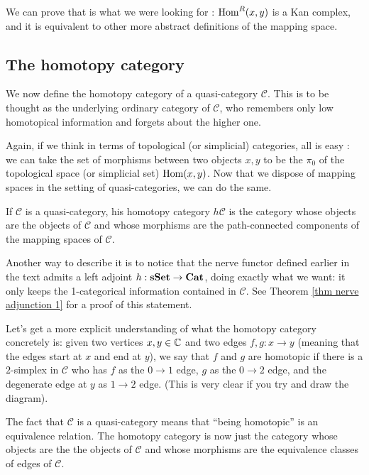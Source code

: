 \begin{refsection}
We can prove that is what we were looking for :  $\mathrm{Hom}^R(x,y)$ is a Kan complex, and it is equivalent to other more abstract definitions of the mapping space.



\subsection{The homotopy category}

We now define the homotopy category of a quasi-category $\mathcal C$. This is to be thought as the underlying ordinary category of $\mathcal C$, who remembers only low homotopical information and forgets about the higher one. 

Again, if we think in terms of topological (or simplicial) categories, all is easy : we can take the set of morphisms between two objects $x,y$ to be the $\pi_0$ of the topological space (or simplicial set) $\mathrm{Hom} (x,y)$. Now that we dispose of mapping spaces in the setting of quasi-categories, we can do the same.

\begin{defin}
If $\mathcal C$ is a  quasi-category, his homotopy category $h\mathcal C$ is the category whose objects are the objects of $\mathcal C$ and whose morphisms are the path-connected components of the mapping spaces of $\mathcal C$.
\end{defin}

Another way to describe it is to notice that the nerve functor defined earlier in the text admits a left adjoint $h: \mathbf{sSet} \to \mathbf{Cat}$, doing exactly what we want: it only keeps the 1-categorical information contained in $\mathcal C$. See Theorem \ref{thm nerve adjunction 1} for a proof of this statement.

Let's get a more explicit understanding of what the homotopy category concretely is: given two vertices $x,y \in \mathbb{C}$ and two edges $f,g : x \to y$ (meaning that the edges start at $x$ and end at $y$), we say that $f$ and $g$ are homotopic if there is a $2$-simplex in $\mathcal C$ who has $f$ as the $0\to 1$ edge, $g$ as the $0\to 2$ edge, and the degenerate edge at $y$ as $1 \to 2$ edge. (This is very clear if you try and draw the diagram).

The fact that $\mathcal C$ is a quasi-category means that ``being homotopic'' is an equivalence relation. The homotopy category is now just the category whose objects are the the objects of $\mathcal C$ and whose morphisms are the equivalence classes of edges of $\mathcal C$.




\end{refsection}
